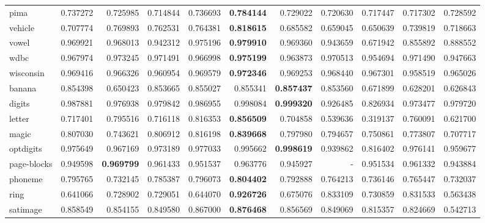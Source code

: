 \begin{tabular}{lrrrrrrrrrr}
pima            &   0.737272 &  0.725985 &  0.714844 &  0.736693 &  \textbf{0.784144} &  0.729022 &  0.720630 &  0.717447 &  0.717302 &  0.728592 \\
vehicle         &   0.707774 &  0.769893 &  0.762531 &  0.764381 &  \textbf{0.818615} &  0.685582 &  0.659045 &  0.650639 &  0.739819 &  0.718663 \\
vowel           &   0.969921 &  0.968013 &  0.942312 &  0.975196 &  \textbf{0.979910} &  0.969360 &  0.943659 &  0.671942 &  0.855892 &  0.888552 \\
wdbc            &   0.967974 &  0.973245 &  0.971491 &  0.966998 &  \textbf{0.975199} &  0.963873 &  0.970513 &  0.954694 &  0.971490 &  0.947663 \\
wisconsin       &   0.969416 &  0.966326 &  0.960954 &  0.969579 &  \textbf{0.972346} &  0.969253 &  0.968440 &  0.967301 &  0.958519 &  0.965026 \\
banana          &   0.854398 &  0.650423 &  0.853665 &  0.855027 &  0.855341 &  \textbf{0.857437} &  0.853560 &  0.671899 &  0.628201 &  0.626843 \\
digits          &   0.987881 &  0.976938 &  0.979842 &  0.986955 &  0.998084 &  \textbf{0.999320} &  0.926485 &  0.826934 &  0.973477 &  0.979720 \\
letter          &   0.717401 &  0.795516 &  0.716118 &  0.816353 &  \textbf{0.856509} &  0.704858 &  0.539636 &  0.319137 &  0.760091 &  0.621700 \\
magic           &   0.807030 &  0.743621 &  0.806912 &  0.816198 &  \textbf{0.839668} &  0.797980 &  0.794657 &  0.750861 &  0.773807 &  0.707717 \\
optdigits       &   0.975649 &  0.967169 &  0.973189 &  0.977033 &  0.995662 &  \textbf{0.998619} &  0.939862 &  0.816402 &  0.976141 &  0.959677 \\
page-blocks     &   0.949598 &  \textbf{0.969799} &  0.961433 &  0.951537 &  0.963776 &  0.945927 &       -   &  0.951534 &  0.961332 &  0.943884 \\
phoneme         &   0.795765 &  0.732145 &  0.785387 &  0.796073 &  \textbf{0.804402} &  0.792888 &  0.764213 &  0.736146 &  0.765447 &  0.732037 \\
ring            &   0.641066 &  0.728902 &  0.729051 &  0.644070 &  \textbf{0.926726} &  0.675076 &  0.833109 &  0.730859 &  0.831533 &  0.563438 \\
satimage        &   0.858549 &  0.854155 &  0.849580 &  0.867000 &  \textbf{0.876468} &  0.856569 &  0.849069 &  0.815357 &  0.824669 &  0.542713 \\

\end{tabular}
